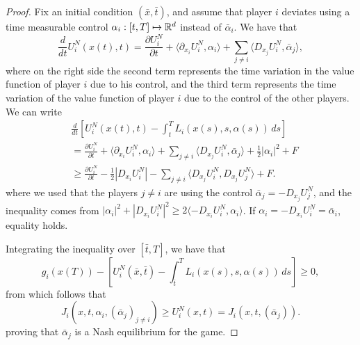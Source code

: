 \begin{proof}
Fix an initial condition $(\bar x, \bar t)$, and assume that player $i$ deviates
using a time measurable control $\alpha_i : [t,T] \mapsto \mathbb{R}^d$ instead of $\bar \alpha_i$.
We have that
\begin{equation*}
    \frac{d}{dt} U^N_i (x(t), t) = \frac{\partial U^N_i}{\partial t}
    + \langle \partial_{x_i}U^N_i, \alpha_i \rangle
    + \sum_{j\neq i} \langle D_{x_j} U^N_i, \bar \alpha_j \rangle,
\end{equation*}
where on the right side the second term represents the time variation in the value
function of player $i$ due to his control, and the third term represents the time
variation of the value function of player $i$ due to the control of the other players.
We can write
\begin{align*}
    &\frac{d}{dt} \left[ U^N_i (x(t), t)
    - \int_t^T L_i\left(x(s), s, \alpha(s)\right)\, ds \right]\\
    &= \frac{\partial U^N_i}{\partial t}
    + \langle \partial_{x_i}U^N_i, \alpha_i \rangle
    + \sum_{j\neq i} \langle D_{x_j} U^N_i, \bar \alpha_j \rangle
    + \frac{1}{2} |\alpha_i|^2 + F \\
    & \geq \frac{\partial U^N_i}{\partial t}
    - \frac{1}{2} |D_{x_i} U_i^N|
    - \sum_{j\neq i} \langle D_{x_j} U^N_i, D_{x_j} U^N_j \rangle
    + F.
\end{align*}
where we used that the players $j\neq i$ are using the control
$\bar \alpha_j = - D_{x_j} U^N_j$, and the inequality comes from
$|\alpha_i|^2 + |D_{x_i} U^N_i|^2 \geq 2\langle -D_{x_i} U^N_i, \alpha_i \rangle$.
If $\alpha_i = -D_{x_i} U^N_i = \bar \alpha_i$, equality holds.

Integrating the inequality over $[\bar t, T]$, we have that
\begin{equation*}
    g_i(x(T)) - \left[ U^N_i (\bar x, \bar t) - \int^T_{\bar t} L_i (x(s), s, \alpha(s)) \, ds \right] \geq 0,
\end{equation*}
from which follows that
\begin{equation*}
    J_i(x, t, \alpha_i, {({\bar\alpha}_j)}_{j\neq i} ) \geq U^N_i (x,t) = J_i(x, t, ({\bar \alpha_j})).
\end{equation*}
proving that $\bar \alpha_j$ is a Nash equilibrium for the game.
\end{proof}

